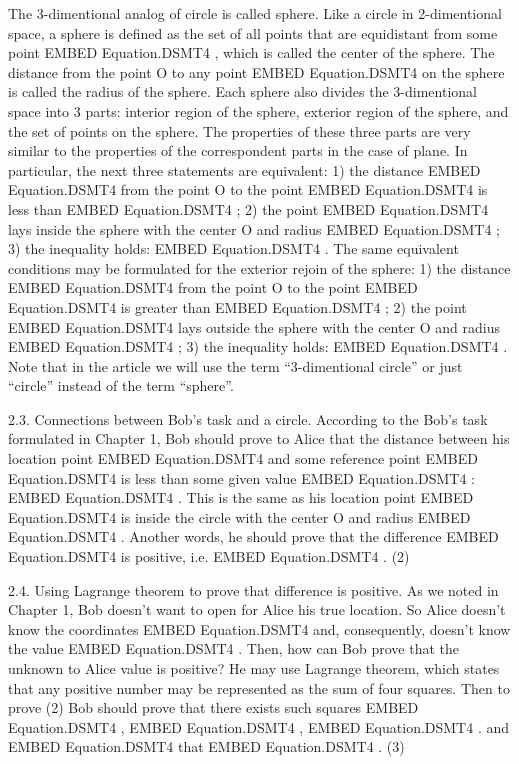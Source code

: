 \documentclass{article}
\begin{document}
The 3-dimentional analog of circle is called sphere. Like a circle in 2-dimentional space,
a sphere is defined as the set of all points that are equidistant from some point  EMBED Equation.DSMT4  , which is called the center of the sphere.
The distance from the point O to any point  EMBED Equation.DSMT4   on the sphere is called the radius of the sphere.
Each sphere also divides the 3-dimentional space into 3 parts: interior region of the sphere, exterior region of the sphere, and the set of points on the sphere.
The properties of these three parts are very similar to the properties of the correspondent parts in the case of plane.
In particular, the next three statements are equivalent:
1) the distance  EMBED Equation.DSMT4   from the point O to the point  EMBED Equation.DSMT4   is less than  EMBED Equation.DSMT4  ;
2) the point  EMBED Equation.DSMT4   lays inside the sphere with the center O and radius  EMBED Equation.DSMT4  ;
3) the inequality holds:
 EMBED Equation.DSMT4  .
The same equivalent conditions may be formulated for the exterior rejoin of the sphere:
1) the distance  EMBED Equation.DSMT4   from the point O to the point  EMBED Equation.DSMT4   is greater than  EMBED Equation.DSMT4  ;
2) the point  EMBED Equation.DSMT4   lays outside the sphere with the center O and radius  EMBED Equation.DSMT4  ;
3) the inequality holds:
 EMBED Equation.DSMT4  .
Note that in the article we will use the term “3-dimentional circle” or just “circle” instead of the term “sphere”.

2.3. Connections between Bob’s task and a circle.
According to the Bob’s task formulated in Chapter 1,
Bob should prove to Alice that the distance between his location point  EMBED Equation.DSMT4
and some reference point  EMBED Equation.DSMT4   is less than some given value  EMBED Equation.DSMT4  :
 EMBED Equation.DSMT4  .
This is the same as his location point  EMBED Equation.DSMT4   is inside the circle with the center O and radius  EMBED Equation.DSMT4  .
Another words, he should prove that the difference
 EMBED Equation.DSMT4  
is positive, i.e.
 EMBED Equation.DSMT4  .                                    (2)

2.4. Using Lagrange theorem to prove that difference is positive.
As we noted in Chapter 1, Bob doesn’t want to open for Alice his true location.
So Alice doesn’t know the coordinates  EMBED Equation.DSMT4   and, consequently, doesn’t know the value
 EMBED Equation.DSMT4  .
Then, how can Bob prove that the unknown to Alice value is positive?
He may use Lagrange theorem, which states that any positive number may be represented as the sum of four squares.
Then to prove (2) Bob should prove that there exists such squares  EMBED Equation.DSMT4  ,  EMBED Equation.DSMT4  ,  EMBED Equation.DSMT4  . and  EMBED Equation.DSMT4   that
 EMBED Equation.DSMT4  .                     (3)
\end{document}
